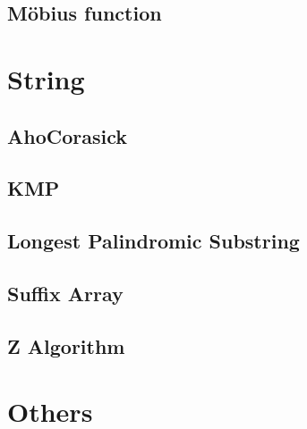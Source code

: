 \documentclass[11pt,twocolumn,a4paper]{article}
\begin{document}
\subsection{Möbius function}



\newpage
\section{String}
\subsection{AhoCorasick}


\subsection{KMP}


\subsection{Longest Palindromic Substring}


\subsection{Suffix Array}


\subsection{Z Algorithm}



\newpage
\section{Others}
\end{document}
